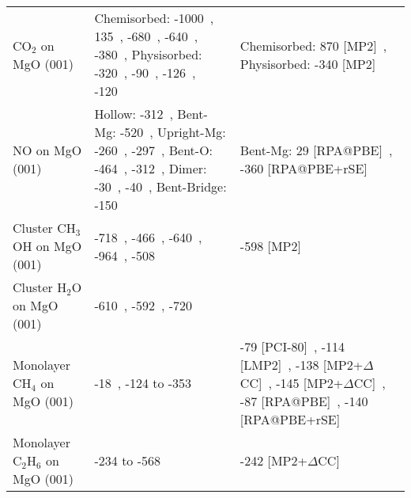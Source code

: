 \begin{table}
\begin{adjustbox}{center}
\begin{tabular}{lp{7cm}p{7cm}}
CO$_2$ on MgO (001) & Chemisorbed: -1000~\cite{manaeActivationCO2CH42022}, 135~\cite{jensenCO2SorptionMgO2005b}, -680~\cite{downingReactivityCO2MgO2013}, -640~\cite{mazheikaNiSubstitutionalDefects2016a}, -380~\cite{baltrusaitisPeriodicDFTStudy2012a}, Physisorbed: -320~\cite{lvCO2AdsorptionKpromoted2024}, -90~\cite{cornuLewisAcidoBasicInteractions2012b}, -126~\cite{hammamiCO2AdsorptionSurfaces2008}, -120~\cite{manaeActivationCO2CH42022} & Chemisorbed: 870 [MP2]~\cite{pacchioniInitioClusterModel1994b}, Physisorbed: -340 [MP2]~\cite{pacchioniPhysisorbedChemisorbedCO21993a} \\
NO on MgO (001) & Hollow: -312~\cite{songRemarkablyStrongChemisorption2017a}, Bent-Mg: -520~\cite{yanagisawaThreeTypesAdsorptions1999b}, Upright-Mg: -260~\cite{rodriguezStudiesBehaviorMixedmetal2001d}, -297~\cite{anezNONO2Adsorption2017a}, Bent-O: -464~\cite{mileticFirstPrinciplesCharacterizationNOx2003a}, -312~\cite{schneiderDramaticCooperativeEffects2002a,schneiderQualitativeDifferencesAdsorption2004a}, Dimer: -30~\cite{luAdsorptionDecompositionNO1999b}, -40~\cite{divalentinNOMonomersMgO2002a}, Bent-Bridge: -150~\cite{limDensityFunctionalTheory2019} & Bent-Mg: 29 [RPA@PBE]~\cite{bajdichSurfaceEnergeticsAlkalineearth2015b}, -360 [RPA@PBE+rSE]~\cite{bajdichSurfaceEnergeticsAlkalineearth2015b} \\
Cluster CH$_3$OH on MgO (001) & -718~\cite{rodriguezAdsorptionMethanolMolecules2007b}, -466~\cite{gayDensityFunctionalStudy2005a}, -640~\cite{manTheoreticalAspectsMethyl2017}, -964~\cite{a.sainnaCombinedPeriodicDFT2021a}, -508~\cite{petitjeanQuantitativeInvestigationMgO2010a} & -598 [MP2]~\cite{brandaTheoreticalStudyCharge2002b} \\
Cluster H$_2$O on MgO (001) & -610~\cite{huProtonTransferAdsorbed2010a}, -592~\cite{alvimDensityFunctionalTheorySimulation2012}, -720~\cite{dingHydrationStructureFlat2021} &  \\
Monolayer CH$_4$ on MgO (001) & -18~\cite{drummondDensityFunctionalInvestigation2006a,stimacSimulatingCH4Physisorption2008}, -124 to -353~\cite{r.rehakIncludingDispersionDensity2020} & -79 [PCI-80]~\cite{todnemMolecularAdsorptionMethane1999a}, -114 [LMP2]~\cite{pisaniPeriodicLocalMP22008b}, -138 [MP2+$\Delta$CC]~\cite{tosoniAccurateQuantumChemical2010}, -145 [MP2+$\Delta$CC]~\cite{alessioChemicallyAccurateAdsorption2018}, -87 [RPA@PBE]~\cite{bajdichSurfaceEnergeticsAlkalineearth2015b}, -140 [RPA@PBE+rSE]~\cite{bajdichSurfaceEnergeticsAlkalineearth2015b} \\
Monolayer C$_2$H$_6$ on MgO (001) & -234 to -568~\cite{r.rehakIncludingDispersionDensity2020} & -242 [MP2+$\Delta$CC]~\cite{alessioChemicallyAccurateAdsorption2018} \\

\end{tabular}
\end{adjustbox}
\end{table}
